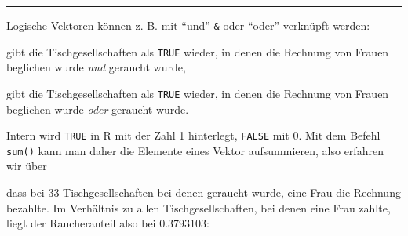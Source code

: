 \documentclass[12pt,ngerman,paper=a4,pagesize,DIV=13]{scrreprt}
\newenvironment{Shaded}{\begin{snugshade}}{\end{snugshade}}
\newcommand{\KeywordTok}[1]{\textcolor[rgb]{0.13,0.29,0.53}{\textbf{#1}}}
\newcommand{\NormalTok}[1]{#1}
\newcommand{\OperatorTok}[1]{\textcolor[rgb]{0.81,0.36,0.00}{\textbf{#1}}}
\newcommand{\StringTok}[1]{\textcolor[rgb]{0.31,0.60,0.02}{#1}}
\begin{document}
\begin{center}\rule{0.5\linewidth}{\linethickness}\end{center}

Logische Vektoren können z. B. mit \enquote{und} \texttt{\&} oder
\enquote{oder} \texttt{\textbar{}} verknüpft werden:

\begin{Shaded}
\end{Shaded}

gibt die Tischgesellschaften als \texttt{TRUE} wieder, in denen die
Rechnung von Frauen beglichen wurde \emph{und} geraucht wurde,

\begin{Shaded}
\end{Shaded}

gibt die Tischgesellschaften als \texttt{TRUE} wieder, in denen die
Rechnung von Frauen beglichen wurde \emph{oder} geraucht wurde.

Intern wird \texttt{TRUE} in R mit der Zahl 1 hinterlegt, \texttt{FALSE}
mit 0. Mit dem Befehl \texttt{sum()} kann man daher die Elemente eines
Vektor aufsummieren, also erfahren wir über

\begin{Shaded}
\end{Shaded}

dass bei 33 Tischgesellschaften bei denen geraucht wurde, eine Frau die
Rechnung bezahlte. Im Verhältnis zu allen Tischgesellschaften, bei denen
eine Frau zahlte, liegt der Raucheranteil also bei 0.3793103:

\begin{Shaded}
\end{Shaded}
\end{document}
